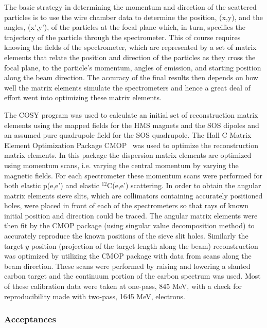 \documentclass[aps,prl,twocolumn,showpacs,amsmath,amssymb,floats]{revtex4}
\begin{document}
The basic strategy in determining the momentum and direction of the scattered 
particles is to use the wire chamber data to determine the position, (x,y), and 
the angles, (x',y'), of the particles at the focal plane which, in turn, 
specifies the trajectory of the particle through the spectrometer.  This of 
course requires knowing the fields of the spectrometer, which are represented by 
a set of matrix elements that relate the position and direction of the particles 
as they cross the focal plane, to the particle's momentum, angles of emission, 
and starting position along the beam direction.  The accuracy of the final 
results then depends on how well the matrix elements simulate the spectrometers 
and hence a great deal of effort went into optimizing these matrix elements.
 
The COSY program was used to calculate an initial set of 
reconstruction matrix elements using the mapped fields for the HMS magnets and 
the SOS dipoles and an assumed pure quadrupole field for the SOS quadrupole. 
The Hall C Matrix Element Optimization Package CMOP~\cite{cosy2} was used to 
optimize the reconstruction matrix elements. In this package 
the dispersion matrix elements are optimized using 
momentum scans, i.e. varying the central momentum by varying the magnetic fields. 
For each spectrometer these momentum scans were performed for both elastic p(e,e') 
and elastic $^{12}$C(e,e') scattering.  
In order to obtain the angular matrix elements sieve slits, which are 
collimators containing accurately positioned holes, were placed in front of 
each of the spectrometers so that rays of known initial position and direction 
could be traced. The angular matrix elements were then fit by the CMOP package 
(using singular value decomposition method) to accurately reproduce the known 
positions of the sieve slit holes. Similarly the target $y$ position 
(projection of the target length along the beam) reconstruction was 
optimized by utilizing the CMOP package with data from scans along the 
beam direction. These scans were performed by raising and lowering a 
slanted carbon target and the continuum portion of the carbon spectrum was 
used. Most of these calibration data were taken at 
one-pass, 845 MeV, with a check for reproducibility made with two-pass, 1645 MeV, 
electrons. 

\subsubsection*{Acceptances}
\end{document}
